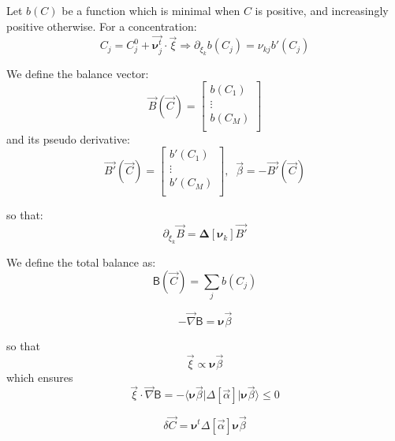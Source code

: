 \documentclass[aps,12pt]{revtex4}
\begin{document}
Let $b(C)$ be a function which is minimal when $C$ is positive, and increasingly positive otherwise.
For a concentration:
\begin{equation}
C_j = C_j^0 + \vec{\bm{\nu}^t_j} \cdot \vec{\xi} \Rightarrow \partial_{\xi_k} b(C_j) = \nu_{kj} b'(C_j)
\end{equation}

We define the balance vector:
\begin{equation}
\vec{B}(\vec{C}) = 
\begin{bmatrix}
	b(C_1) \\
	\vdots\\
	b(C_M)\\
\end{bmatrix}
\end{equation}
and its pseudo derivative:
\begin{equation}
\vec{B'}(\vec{C}) = 
\begin{bmatrix}
	b'(C_1) \\
	\vdots\\
	b'(C_M)\\
\end{bmatrix},
\;\;\vec{\beta} = - \vec{B'}(\vec{C})
\end{equation} 

so that:
\begin{equation}
	\partial_{\xi_k} \vec{B} = \bm{\Delta}[\bm{\nu}_k] \vec{B'}
\end{equation}

We define the total balance as:
\begin{equation}
	\mathsf{B}(\vec{C}) = \sum_j b(C_j)
\end{equation}

\begin{equation}
	-\vec{\nabla} \mathsf{B} = \bm{\nu} \vec{\beta}
\end{equation}

so that
\begin{equation}
	\vec{\xi} \propto \bm{\nu} \vec{\beta} 
\end{equation}
which ensures
\begin{equation}
	\vec{\xi} \cdot \vec{\nabla} \mathsf{B} = - \langle \bm{\nu} \vec{\beta} \vert \Delta[\vec{\alpha}]  \vert \bm{\nu} \vec{\beta} \rangle \leq 0 
\end{equation}

\begin{equation}
	\delta\vec{C} = \bm{\nu}^t \Delta[\vec{\alpha}] \bm{\nu} \vec{\beta}
\end{equation}
\end{document}
